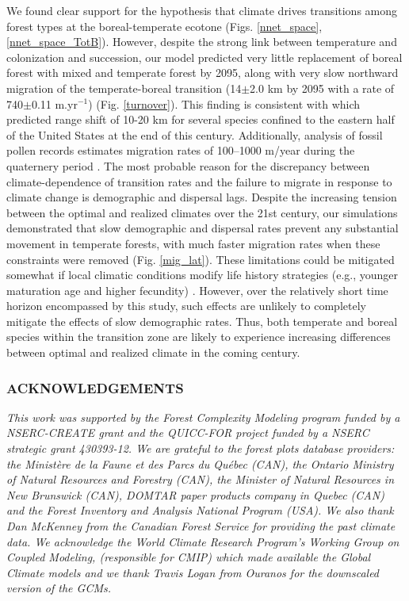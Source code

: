 We found clear support for the hypothesis that climate drives transitions among forest types at the
boreal-temperate ecotone (Figs. \ref{nnet_space}, \ref{nnet_space_TotB}).  However, despite the
strong link between temperature and colonization and succession, our model predicted very little
replacement of boreal forest with mixed and temperate forest by 2095, along with very slow northward
migration of the temperate-boreal transition (14$\pm$2.0 km by 2095 with a rate of 740$\pm$0.11
m.yr$^{-1}$) (Fig. \ref{turnover}). This finding is consistent with \citet{Iverson2004} which
predicted range shift of 10-20 km for several species confined to the eastern half of the United
States at the end of this century.  Additionally, analysis of fossil pollen records estimates
migration rates of 100--1000 m/year during the quaternery period
\citep{Davis1981,MacDonald1986,McLachlan2005}. The most probable reason for the discrepancy between
climate-dependence of transition rates and the failure to migrate in response to climate change is
demographic and dispersal lags. Despite the increasing tension between the optimal and realized
climates over the 21st century, our simulations demonstrated that slow demographic and dispersal
rates prevent any substantial movement in temperate forests, with much faster migration rates when
these constraints were removed (Fig. \ref{mig_lat}). These limitations could be mitigated somewhat
if local climatic conditions modify life history strategies (e.g., younger maturation age and higher
fecundity) \citep{Snell2014a}.  However, over the relatively short time horizon encompassed by this
study, such effects are unlikely to completely mitigate the effects of slow demographic rates. Thus,
both temperate and boreal species within the transition zone are likely to experience increasing
differences between optimal and realized climate in the coming century. 

\subsubsection*{\uppercase{Acknowledgements}}
\textit{This work was supported by the Forest Complexity Modeling program
funded by a NSERC-CREATE grant and the QUICC-FOR project funded by a NSERC
strategic grant 430393-12. We are grateful to the forest plots database providers: the
Ministère de la Faune et des Parcs du Québec (CAN), the Ontario Ministry of
Natural Resources and Forestry (CAN), the Minister of Natural Resources in New
Brunswick (CAN), DOMTAR paper products company in Quebec (CAN) and the Forest
Inventory and Analysis National Program (USA). We also thank Dan McKenney from
the Canadian Forest Service for providing the past climate data.  We
acknowledge the World Climate Research Program's Working Group on Coupled
Modeling, (responsible for CMIP) which made available the Global Climate
models and we thank Travis Logan from Ouranos for the downscaled version of
the GCMs.}

